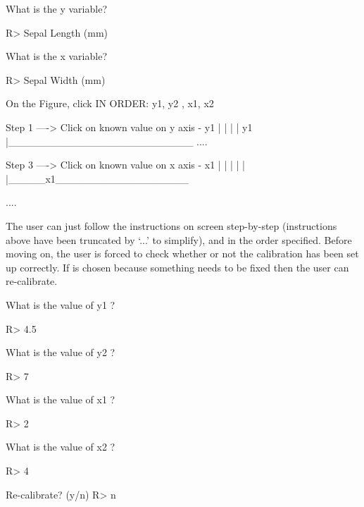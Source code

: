 \documentclass[article]{jss}
\begin{document}
\begin{CodeChunk}
\begin{CodeOutput}
What is the y variable? 
\end{CodeOutput}
\begin{CodeInput}
R> Sepal Length (mm)
\end{CodeInput}

\begin{CodeOutput}
What is the x variable? 
\end{CodeOutput}
\begin{CodeInput}
R> Sepal Width (mm)
\end{CodeInput}

\begin{CodeOutput}
On the Figure, click IN ORDER: 
      y1, y2 , x1, x2  


    Step 1 ----> Click on known value on y axis - y1
  |
  |
  |
  |
  y1
  |_________________________
  ....

    Step 3 ----> Click on known value on x axis - x1
  |
  |
  |
  |
  |
  |_____x1__________________

  ....
\end{CodeOutput}
\end{CodeChunk}

The user can just follow the instructions on screen step-by-step (instructions above have been truncated by `...' to simplify), and in the order specified. Before moving on, the user is forced to check whether or not the calibration has been set up correctly. If  is chosen because something needs to be fixed then the user can re-calibrate.

\begin{CodeChunk}
\begin{CodeOutput}
What is the value of y1 ?
\end{CodeOutput}
\begin{CodeInput}
R> 4.5
\end{CodeInput}
\begin{CodeOutput}
What is the value of y2 ?
\end{CodeOutput}
\begin{CodeInput}
R> 7
\end{CodeInput}
\begin{CodeOutput}
What is the value of x1 ?
\end{CodeOutput}
\begin{CodeInput}
R> 2
\end{CodeInput}
\begin{CodeOutput}
What is the value of x2 ?
\end{CodeOutput}
\begin{CodeInput}
R> 4
\end{CodeInput}
\begin{CodeOutput}
Re-calibrate? (y/n) 
R> n
\end{CodeOutput}
\end{CodeChunk}
\end{document}
